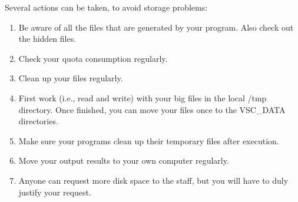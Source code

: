 Several actions can be taken, to avoid storage problems:

\begin{enumerate}
\item  Be aware of all the files that are generated by your program. Also check out the hidden files.
\item  Check your quota consumption regularly.
\item  Clean up your files regularly.
\item  First work (i.e., read and write) with your big files in the local /tmp directory. Once finished, you can move your files once to the VSC\_DATA directories.
\item  Make sure your programs clean up their temporary files after execution.
\item  Move your output results to your own computer regularly.
\item  Anyone can request more disk space to the \hpc staff, but you will have to duly justify your request.
\end{enumerate}


%
%
%
%
%
%
%
%
%
%

